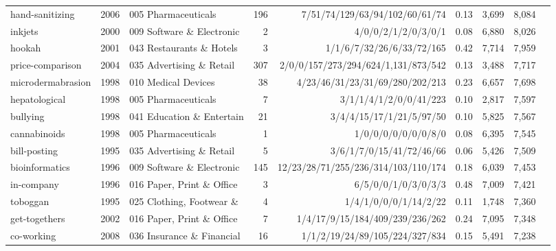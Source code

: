 {\begin{tabular}{llp{3.2cm}rrp{3.4cm}rrr}
hand-sanitizing & 2006 & 005 Pharmaceuticals & 196 & 7/51/74/129/63/94/102/60/61/74 & 0.13 & 3,699 & 8,084 \\
inkjets & 2000 & 009 Software \& Electronic & 2 & 4/0/0/2/1/2/0/3/0/1 & 0.08 & 6,880 & 8,026 \\
hookah & 2001 & 043 Restaurants \& Hotels & 3 & 1/1/6/7/32/26/6/33/72/165 & 0.42 & 7,714 & 7,959 \\
price-comparison & 2004 & 035 Advertising \& Retail & 307 & 2/0/0/157/273/294/624/1,131/873/542 & 0.13 & 3,488 & 7,717 \\
microdermabrasion & 1998 & 010 Medical Devices & 38 & 4/23/46/31/23/31/69/280/202/213 & 0.23 & 6,657 & 7,698 \\
hepatological & 1998 & 005 Pharmaceuticals & 7 & 3/1/1/4/1/2/0/0/41/223 & 0.10 & 2,817 & 7,597 \\
bullying & 1998 & 041 Education \& Entertain & 21 & 3/4/4/15/17/1/21/5/97/50 & 0.10 & 5,825 & 7,567 \\
cannabinoids & 1998 & 005 Pharmaceuticals & 1 & 1/0/0/0/0/0/0/0/8/0 & 0.08 & 6,395 & 7,545 \\
bill-posting & 1995 & 035 Advertising \& Retail & 5 & 3/6/1/7/0/15/41/72/46/66 & 0.06 & 5,426 & 7,509 \\
bioinformatics & 1996 & 009 Software \& Electronic & 145 & 12/23/28/71/255/236/314/103/110/174 & 0.18 & 6,039 & 7,453 \\
in-company & 1996 & 016 Paper, Print \& Office & 3 & 6/5/0/0/1/0/3/0/3/3 & 0.48 & 7,009 & 7,421 \\
toboggan & 1995 & 025 Clothing, Footwear \&  & 4 & 1/4/1/0/0/0/1/14/2/22 & 0.11 & 1,748 & 7,360 \\
get-togethers & 2002 & 016 Paper, Print \& Office & 7 & 1/4/17/9/15/184/409/239/236/262 & 0.24 & 7,095 & 7,348 \\
co-working & 2008 & 036 Insurance \& Financial & 16 & 1/1/2/19/24/89/105/224/327/834 & 0.15 & 5,491 & 7,238 \\
\bottomrule
\end{tabular}}
